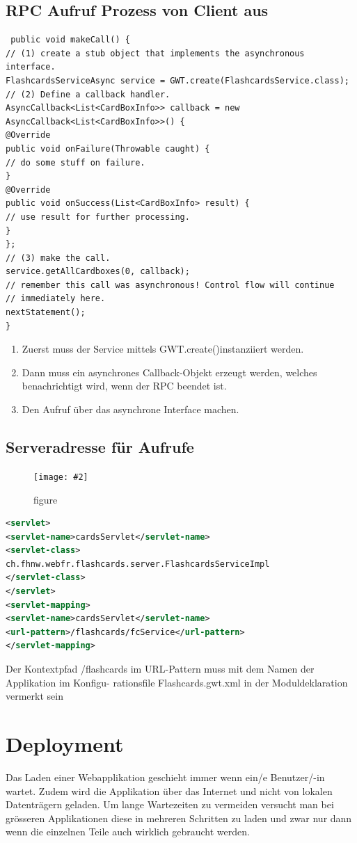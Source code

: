 \documentclass[a4paper,10pt]{scrreprt}
\newcommand{\pic}[2][figure]{\begin{figure}[h]
 \centering
 \texttt{[image: \#2]}
 \caption{#1}
\end{figure}
}
\begin{document}
\section{RPC Aufruf Prozess von Client aus}
\begin{lstlisting}
 public void makeCall() {
// (1) create a stub object that implements the asynchronous interface.
FlashcardsServiceAsync service = GWT.create(FlashcardsService.class);
// (2) Define a callback handler.
AsyncCallback<List<CardBoxInfo>> callback = new AsyncCallback<List<CardBoxInfo>>() {
@Override
public void onFailure(Throwable caught) {
// do some stuff on failure.
}
@Override
public void onSuccess(List<CardBoxInfo> result) {
// use result for further processing.
}
};
// (3) make the call.
service.getAllCardboxes(0, callback);
// remember this call was asynchronous! Control flow will continue
// immediately here.
nextStatement();
}
\end{lstlisting}
\begin{enumerate}
 \item Zuerst muss der Service mittels GWT.create()instanziiert werden.
\item Dann muss ein asynchrones Callback-Objekt erzeugt werden, welches benachrichtigt wird,
wenn der RPC beendet ist.
\item Den Aufruf über das asynchrone Interface machen.
\end{enumerate}

\section{Serveradresse für Aufrufe}
\pic{serveradrrpc.png}
\begin{lstlisting}[caption=RPC App Deployment Descriptor,language=xml]
 <servlet>
<servlet-name>cardsServlet</servlet-name>
<servlet-class>
ch.fhnw.webfr.flashcards.server.FlashcardsServiceImpl
</servlet-class>
</servlet>
<servlet-mapping>
<servlet-name>cardsServlet</servlet-name>
<url-pattern>/flashcards/fcService</url-pattern>
</servlet-mapping>
\end{lstlisting}
Der Kontextpfad /flashcards im URL-Pattern muss mit dem Namen der Applikation im Konfigu-
rationsfile Flashcards.gwt.xml in der Moduldeklaration vermerkt sein

\chapter{Deployment}
Das Laden einer Webapplikation geschieht immer wenn ein/e Benutzer/-in wartet. Zudem wird die
Applikation über das Internet und nicht von lokalen Datenträgern geladen. Um lange Wartezeiten zu
vermeiden versucht man bei grösseren Applikationen diese in mehreren Schritten zu laden und zwar
nur dann wenn die einzelnen Teile auch wirklich gebraucht werden.
\end{document}
